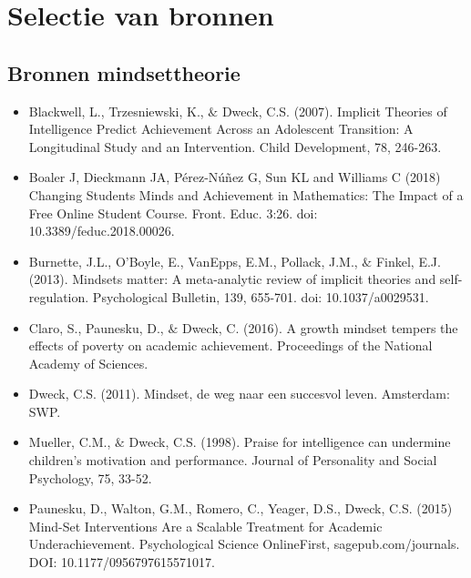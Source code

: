 \documentclass{article}
\begin{document}


\section{Selectie van bronnen}
\subsection{Bronnen mindsettheorie}
\begin{itemize}
	\item {\fontsize{11pt}{13.2pt}\selectfont Blackwell, L., Trzesniewski, K., $\&$  Dweck, C.S. (2007). Implicit Theories of Intelligence Predict Achievement Across an Adolescent Transition: A Longitudinal Study and an Intervention. Child Development, 78, 246-263.\par}\par

	\item {\fontsize{11pt}{13.2pt}\selectfont Boaler J, Dieckmann JA, Pérez-Núñez G, Sun KL and Williams C (2018) Changing Students Minds and Achievement in Mathematics: The Impact of a Free Online Student Course. Front. Educ. 3:26. doi: 10.3389/feduc.2018.00026.\par}\par

	\item {\fontsize{11pt}{13.2pt}\selectfont Burnette, J.L., O’Boyle, E., VanEpps, E.M., Pollack, J.M., $\&$  Finkel, E.J. (2013). Mindsets matter: A meta-analytic review of implicit theories and self-regulation. Psychological Bulletin, 139, 655-701. doi: 10.1037/a0029531.\par}\par

	\item {\fontsize{11pt}{13.2pt}\selectfont Claro, S., Paunesku, D., $\&$  Dweck, C. (2016). A growth mindset tempers the effects of poverty on academic achievement. Proceedings of the National Academy of Sciences.\par}\par

	\item {\fontsize{11pt}{13.2pt}\selectfont Dweck, C.S. (2011). Mindset, de weg naar een succesvol leven. Amsterdam: SWP.\par}\par

	\item {\fontsize{11pt}{13.2pt}\selectfont Mueller, C.M., $\&$  Dweck, C.S. (1998). Praise for intelligence can undermine children's motivation and performance. Journal of Personality and Social Psychology, 75, 33-52.\par}\par

	\item {\fontsize{11pt}{13.2pt}\selectfont Paunesku, D., Walton, G.M., Romero, C., Yeager, D.S., Dweck, C.S. (2015) Mind-Set Interventions Are a Scalable Treatment for Academic Underachievement. Psychological Science OnlineFirst, sagepub.com/journals. DOI: 10.1177/0956797615571017.\par}
\end{itemize}\par
\end{document}
